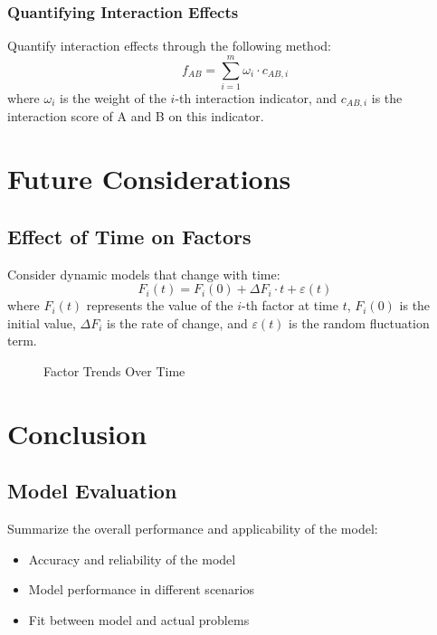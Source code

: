 \documentclass[12pt,a4paper]{article}
\begin{document}
\subsubsection{Quantifying Interaction Effects}
Quantify interaction effects through the following method:
\begin{equation}
f_{AB} = \sum_{i=1}^m \omega_i \cdot c_{AB,i}
\end{equation}
where $\omega_i$ is the weight of the $i$-th interaction indicator, and $c_{AB,i}$ is the interaction score of A and B on this indicator.

\section{Future Considerations}
\subsection{Effect of Time on Factors}
Consider dynamic models that change with time:
\begin{equation}
F_i(t) = F_i(0) + \Delta F_i \cdot t + \varepsilon(t)
\end{equation}
where $F_i(t)$ represents the value of the $i$-th factor at time $t$, $F_i(0)$ is the initial value, $\Delta F_i$ is the rate of change, and $\varepsilon(t)$ is the random fluctuation term.

\begin{figure}[htbp]
  \centering
  \caption{Factor Trends Over Time}
  \label{fig:time_trend}
\end{figure}

\section{Conclusion}
\subsection{Model Evaluation}
Summarize the overall performance and applicability of the model:
\begin{itemize}
  \item Accuracy and reliability of the model
  \item Model performance in different scenarios
  \item Fit between model and actual problems
\end{itemize}
\end{document}
